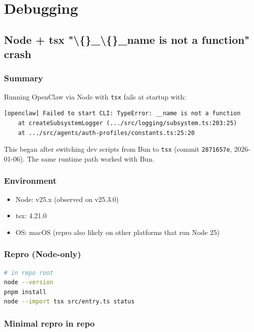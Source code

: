 \chapter{Debugging}

\section{Node + tsx "\textbackslash\{\}\_\textbackslash\{\}\_name is not a function" crash}


\subsection{Summary}


Running OpenClaw via Node with \texttt{tsx} fails at startup with:

\begin{lstlisting}
[openclaw] Failed to start CLI: TypeError: __name is not a function
    at createSubsystemLogger (.../src/logging/subsystem.ts:203:25)
    at .../src/agents/auth-profiles/constants.ts:25:20
\end{lstlisting}


This began after switching dev scripts from Bun to \texttt{tsx} (commit \texttt{2871657e}, 2026-01-06). The same runtime path worked with Bun.

\subsection{Environment}


\begin{itemize}
  \item Node: v25.x (observed on v25.3.0)
  \item tsx: 4.21.0
  \item OS: macOS (repro also likely on other platforms that run Node 25)
\end{itemize}


\subsection{Repro (Node-only)}


\begin{lstlisting}[language=bash]
# in repo root
node --version
pnpm install
node --import tsx src/entry.ts status
\end{lstlisting}


\subsection{Minimal repro in repo}


